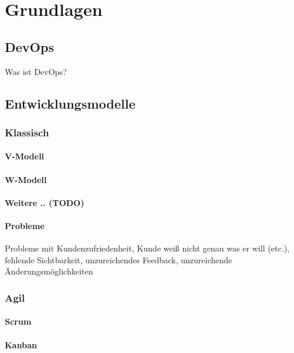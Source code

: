 \chapter{Grundlagen}

\section{DevOps}

Was ist DevOps?

\section{Entwicklungsmodelle}

\subsection{Klassisch}

\subsubsection{V-Modell}

\subsubsection{W-Modell}

\subsubsection{Weitere .. (TODO)}

\subsubsection{Probleme}

Probleme mit Kundenzufriedenheit, Kunde weiß nicht genau was er will (etc.),
fehlende Sichtbarkeit, unzureichendes Feedback, unzureichende Änderungsmöglichkeiten

\subsection{Agil}

\subsubsection{Scrum}

\subsubsection{Kanban}

